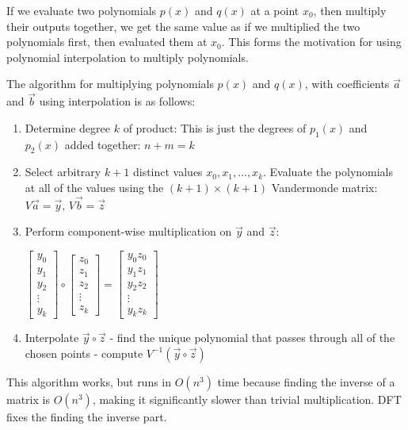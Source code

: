 \documentclass{article}
\begin{document}
If we evaluate two polynomials $p(x)$ and $q(x)$ at a point $x_0$, then multiply their outputs together, we get the same value as if we multiplied the two polynomials first, then evaluated them at $x_0$. This forms the motivation for using polynomial interpolation to multiply polynomials.

The algorithm for multiplying polynomials $p(x)$ and $q(x)$, with coefficients $\vec{a}$ and $\vec{b}$ using interpolation is as follows:

\begin{enumerate}
    \item Determine degree $k$ of product: This is just the degrees of $p_1(x)$ and $p_2(x)$ added together: $n+m=k$
    \item Select arbitrary $k+1$ distinct values $x_0, x_1, \ldots, x_k$. Evaluate the polynomials at all of the values using the $(k+1)\times (k+1)$ Vandermonde matrix: $V\vec{a}=\vec{y}$, $V\vec{b}=\vec{z}$
    \item Perform component-wise multiplication on $\vec{y}$ and $\vec{z}$:

    \centerline{
        $
        \begin{bmatrix}
            y_0 \\ y_1 \\ y_2 \\ \vdots \\ y_k 
        \end{bmatrix} \circ
        \begin{bmatrix}
            z_0 \\ z_1 \\ z_2 \\ \vdots \\ z_k 
        \end{bmatrix} = 
        \begin{bmatrix}
            y_0z_0 \\ y_1z_1 \\ y_2z_2 \\ \vdots \\ y_kz_k 
        \end{bmatrix}
        $
    }
    \item Interpolate $\vec{y}\circ\vec{z}$ - find the unique polynomial that passes through all of the chosen points - compute $V^{-1}(\vec{y}\circ\vec{z})$
\end{enumerate}
This algorithm works, but runs in $O(n^3)$ time because finding the inverse of a matrix is $O(n^3)$, making it significantly slower than trivial multiplication. DFT fixes the finding the inverse part.
\end{document}
